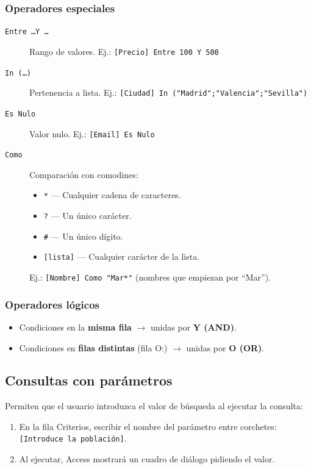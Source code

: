 \documentclass[12pt,a4paper]{article}
\begin{document}
\subsubsection{Operadores especiales}

\begin{description}
  \item[\texttt{Entre \ldots Y \ldots}] Rango de valores. Ej.: \texttt{[Precio] Entre 100 Y 500}
  \item[\texttt{In (\ldots)}] Pertenencia a lista. Ej.: \texttt{[Ciudad] In ("Madrid";"Valencia";"Sevilla")}
  \item[\texttt{Es Nulo}] Valor nulo. Ej.: \texttt{[Email] Es Nulo}
  \item[\texttt{Como}] Comparación con comodines:
    \begin{itemize}
      \item \texttt{*} --- Cualquier cadena de caracteres.
      \item \texttt{?} --- Un único carácter.
      \item \texttt{\#} --- Un único dígito.
      \item \texttt{[lista]} --- Cualquier carácter de la lista.
    \end{itemize}
    Ej.: \texttt{[Nombre] Como "Mar*"} (nombres que empiezan por ``Mar'').
\end{description}

\subsubsection{Operadores lógicos}

\begin{itemize}
  \item Condiciones en la \textbf{misma fila} $\rightarrow$ unidas por \textbf{Y (AND)}.
  \item Condiciones en \textbf{filas distintas} (fila O:) $\rightarrow$ unidas por \textbf{O (OR)}.
\end{itemize}

\subsection{Consultas con parámetros}

Permiten que el usuario introduzca el valor de búsqueda al ejecutar la consulta:

\begin{enumerate}
  \item En la fila Criterios, escribir el nombre del parámetro entre corchetes: \texttt{[Introduce la población]}.
  \item Al ejecutar, Access mostrará un cuadro de diálogo pidiendo el valor.
\end{enumerate}
\end{document}
